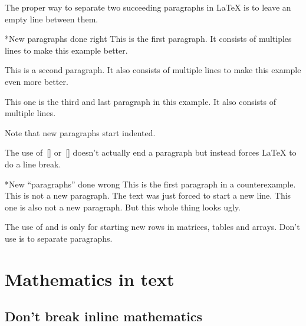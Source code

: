 The proper way to separate two succeeding paragraphs in {\LaTeX} is to leave an empty line between them.
\begin{showlatex}*{New paragraphs done right}
This is the first paragraph.
It consists of multiples lines to make this example better.

This is a second paragraph.
It also consists of multiple lines to make this example even more better.

This one is the third and last paragraph in this example.
It also consists of multiple lines.
\end{showlatex}
Note that new paragraphs start indented.

The use of~\comname{\tbs}\massindex{\tbs}[\comname] or~[\comname] doesn’t actually end a paragraph but instead forces {\LaTeX} to do a line break.
\begin{showlatex}*{New \enquote{paragraphs} done wrong}
This is the first paragraph in a counterexample.\\
This is not a new paragraph.
The text was just forced to start a new line.\newline
This one is also not a new paragraph.
But this whole thing looks ugly.
\end{showlatex}
The use of \comname{\tbs} and  is only for starting new rows in matrices, tables and arrays.
Don’t use is to separate paragraphs.





\section{Mathematics in text}



\subsection{Don’t break inline mathematics}
\label{breaking inline math}

